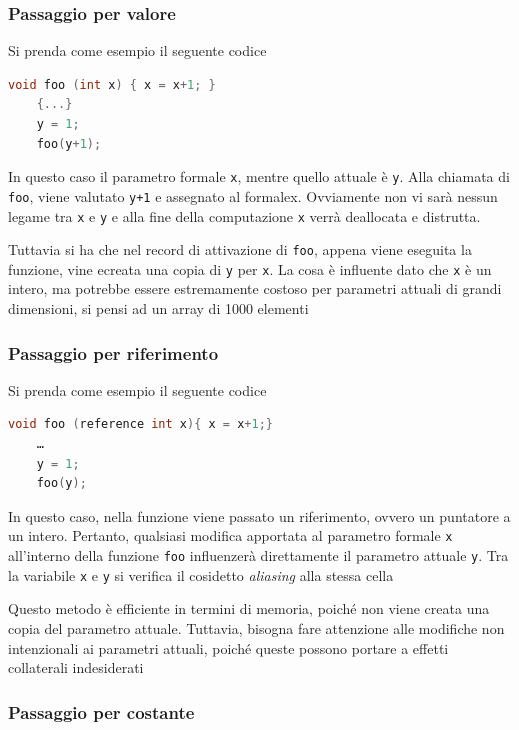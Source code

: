 \subsubsection{Passaggio per valore}
Si prenda come esempio il seguente codice

\begin{lstlisting}[language=C]
    void foo (int x) { x = x+1; }
    {...}
    y = 1;
    foo(y+1);
\end{lstlisting}

In questo caso il parametro formale \texttt{x}, mentre quello attuale è \texttt{y}. Alla chiamata di \texttt{foo}, viene valutato \texttt{y+1} e assegnato al formale{x}. Ovviamente non vi sarà nessun legame tra \texttt{x} e \texttt{y} e alla fine della computazione \texttt{x} verrà deallocata e distrutta.

Tuttavia si ha che nel record  di attivazione di \texttt{foo}, appena viene eseguita la funzione, vine ecreata una copia di \texttt{y} per \texttt{x}. La cosa è influente dato che \texttt{x} è un intero, ma potrebbe essere estremamente costoso per parametri attuali di grandi dimensioni, si pensi ad un array di 1000 elementi

\subsubsection{Passaggio per riferimento}
Si prenda come esempio il seguente codice

\begin{lstlisting}[language=C]
    void foo (reference int x){ x = x+1;}
    …
    y = 1;
    foo(y);
\end{lstlisting}

In questo caso, nella funzione viene passato un riferimento, ovvero un puntatore a un intero. Pertanto, qualsiasi modifica apportata al parametro formale \texttt{x} all'interno della funzione \texttt{foo} influenzerà direttamente il parametro attuale \texttt{y}. Tra la variabile \texttt{x} e \texttt{y} si verifica il cosidetto \textit{aliasing} alla stessa cella

Questo metodo è efficiente in termini di memoria, poiché non viene creata una copia del parametro attuale. Tuttavia, bisogna fare attenzione alle modifiche non intenzionali ai parametri attuali, poiché queste possono portare a effetti collaterali indesiderati

\subsubsection{Passaggio per costante}

